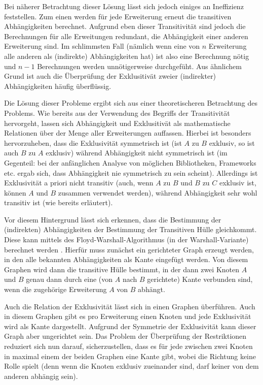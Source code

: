 Bei näherer Betrachtung dieser Lösung lässt sich jedoch einiges an Ineffizienz feststellen. Zum einen werden für jede Erweiterung erneut die transitiven Abhängigkeiten berechnet. Aufgrund eben dieser Transitivität sind jedoch die Berechnungen für alle Erweitungen redundant, die Abhängigkeit einer anderen Erweiterung sind. Im schlimmsten Fall (nämlich wenn eine von $n$ Erweiterung alle anderen als (indirekte) Abhängigkeiten hat) ist also eine Berechnung nötig und $n - 1$ Berechnungen werden unnötigerweise durchgefüht. Aus ähnlichem Grund ist auch die Überprüfung der Exklusitivät zweier (indirekter) Abhängigkeiten häufig überflüssig.

Die Lösung dieser Probleme ergibt sich aus einer theoretischeren Betrachtung des Problems. Wie bereits aus der Verwendung des Begriffs der Transitivität hervorgeht, lassen sich Abhängigkeit und Exklusitivät als mathematische Relationen über der Menge aller Erweiterungen auffassen. Hierbei ist besonders hervorzuheben, dass die Exklusivität symmetrisch ist (ist $A$ zu $B$ exklusiv, so ist auch $B$ zu $A$ exklusiv) während Abhängigkeit nicht symmetrisch ist (im Gegenteil: bei der anfänglichen Analyse von möglichen Bibliotheken, Frameworks etc. ergab sich, dass Abhängigkeit nie symmetrisch zu sein scheint). Allerdings ist Exklusivität a priori nicht transitiv (auch, wenn $A$ zu $B$ und $B$ zu $C$ exklusiv ist, können $A$ und $B$ zusammen verwendet werden), während Abhängigkeit sehr wohl transitiv ist (wie bereits erläutert).

Vor diesem Hintergrund lässt sich erkennen, dass die Bestimmung der (indirekten) Abhängigkeiten der Bestimmung der Transitiven Hülle gleichkommt. Diese kann mittels des Floyd-Warshall-Algorithmus (in der Warshall-Variante) berechnet werden \cite{warshal1_algorithm}. Hierfür muss zunächst ein gerichteter Graph erzeugt werden, in den alle bekannten Abhängigkeiten als Kante eingefügt werden. Von diesem Graphen wird dann die transitive Hülle bestimmt, in der dann zwei Knoten $A$ und $B$ genau dann durch eine (von $A$ nach $B$ gerichtete) Kante verbunden sind, wenn die zugehörige Erweiterung $A$ von $B$ abhängt.

Auch die Relation der Exklusivität lässt sich in einen Graphen überführen. Auch in diesem Graphen gibt es pro Erweiterung einen Knoten und jede Exklusivität wird als Kante dargestellt. Aufgrund der Symmetrie der Exklusivität kann dieser Graph aber ungerichtet sein. Das Problem der Überprüfung der Restriktionen reduziert sich nun darauf, sicherzustellen, dass es für jede zwischen zwei Knoten in maximal einem der beiden Graphen eine Kante gibt, wobei die Richtung keine Rolle spielt (denn wenn die Knoten exklusiv zueinander sind, darf keiner von dem anderen abhängig sein).

